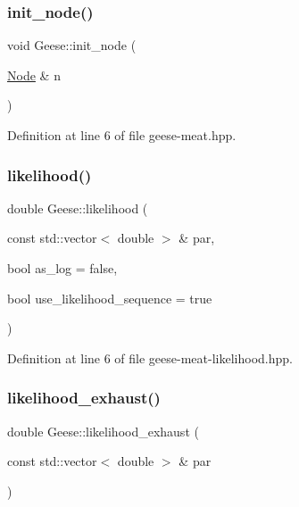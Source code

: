 \mbox{\label{class_geese_a3855898a556e2ac1d30529d3bc35f13a}} 
\subsubsection{\texorpdfstring{init\+\_\+node()}{init\_node()}}
{\footnotesize\ttfamily void Geese\+::init\+\_\+node (\begin{DoxyParamCaption}\item[{\hyperlink{class_node}{Node} \&}]{n }\end{DoxyParamCaption})\hspace{0.3cm}{\ttfamily [inline]}}



Definition at line 6 of file geese-\/meat.\+hpp.

\mbox{\label{class_geese_ac6e787d5b916ca7288adfda7a9b87e56}} 
\subsubsection{\texorpdfstring{likelihood()}{likelihood()}}
{\footnotesize\ttfamily double Geese\+::likelihood (\begin{DoxyParamCaption}\item[{const std\+::vector$<$ double $>$ \&}]{par,  }\item[{bool}]{as\+\_\+log = {\ttfamily false},  }\item[{bool}]{use\+\_\+likelihood\+\_\+sequence = {\ttfamily true} }\end{DoxyParamCaption})\hspace{0.3cm}{\ttfamily [inline]}}



Definition at line 6 of file geese-\/meat-\/likelihood.\+hpp.

\mbox{\label{class_geese_af2d4bac42cc7c8287fb6853d50882115}} 
\subsubsection{\texorpdfstring{likelihood\+\_\+exhaust()}{likelihood\_exhaust()}}
{\footnotesize\ttfamily double Geese\+::likelihood\+\_\+exhaust (\begin{DoxyParamCaption}\item[{const std\+::vector$<$ double $>$ \&}]{par }\end{DoxyParamCaption})\hspace{0.3cm}{\ttfamily [inline]}}




